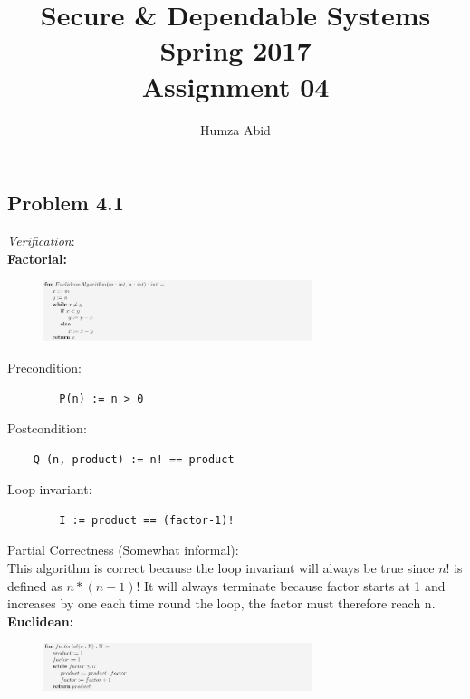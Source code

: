\documentclass[a4paper]{article}
\begin{document}
	
	\title{Secure \& Dependable Systems \\  Spring 2017 \\ Assignment 04}
	\author{Humza Abid}
	\maketitle
	
	\subsection*{Problem 4.1} \textit{Verification}: \\
	
	\textbf{Factorial:}
	
	\begin{figure}[ht]
		\centering
		\includegraphics[width=0.7\textwidth, scale=0.7]{euc_snippet.png}
		\caption*{}
		\label{euc}
	\end{figure}
	
	Precondition:
		
	\begin{verbatim}
		P(n) := n > 0
	\end{verbatim}
	
	Postcondition:
	
	\begin{verbatim}
	Q (n, product) := n! == product 
	\end{verbatim}
		
	Loop invariant:
	
	\begin{verbatim}
		I := product == (factor-1)!    
	\end{verbatim}
	
	Partial Correctness (Somewhat informal):\\
	
	This algorithm is correct because the loop invariant will always be true since $n!$ is defined as $n*(n-1)!$ It will always terminate because factor starts at 1 and increases by one each time round the loop, the factor must therefore reach n. \\
	
	
	\textbf{Euclidean:}

	\begin{figure}[ht]
		\centering
		\includegraphics[width=0.7\textwidth, scale=0.7]{factorial_snippet.png}
		\caption*{}
		\label{factorial}
	\end{figure}
	
\end{document}
